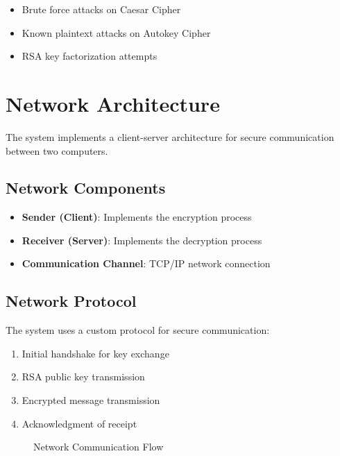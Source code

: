 \documentclass[12pt,a4paper]{article}
\begin{document}
\begin{itemize}
    \item Brute force attacks on Caesar Cipher
    \item Known plaintext attacks on Autokey Cipher
    \item RSA key factorization attempts
\end{itemize}

\section{Network Architecture}
The system implements a client-server architecture for secure communication between two computers.

\subsection{Network Components}
\begin{itemize}
    \item \textbf{Sender (Client)}: Implements the encryption process
    \item \textbf{Receiver (Server)}: Implements the decryption process
    \item \textbf{Communication Channel}: TCP/IP network connection
\end{itemize}

\subsection{Network Protocol}
The system uses a custom protocol for secure communication:
\begin{enumerate}
    \item Initial handshake for key exchange
    \item RSA public key transmission
    \item Encrypted message transmission
    \item Acknowledgment of receipt
\end{enumerate}

\begin{figure}[H]
\centering
{}
\caption{Network Communication Flow}
\end{figure}
\end{document}
